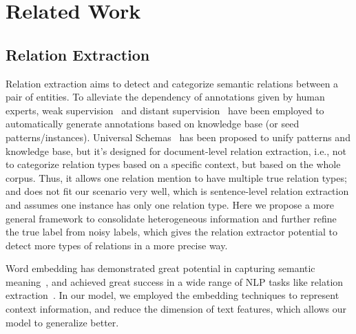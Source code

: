 \section{Related Work}
\label{sect:related}


\subsection{Relation Extraction}
Relation extraction aims to detect and categorize semantic relations between a pair of entities. To alleviate the dependency of annotations given by human experts, weak supervision~\cite{bunescu2007learning,etzioni2004web} and distant supervision~\cite{ren2016cotype} have been employed to automatically generate annotations based on knowledge base (or seed patterns/instances). 
Universal Schemas~\cite{riedel2013relation,verga2015multilingual,toutanova2015representing} has been proposed to unify patterns and knowledge base, but it's designed for document-level relation extraction, i.e., not to categorize relation types based on a specific context, but based on the whole corpus. 
Thus, it allows one relation mention to have multiple true relation types; and does not fit our scenario very well, which is sentence-level relation extraction and assumes one instance has only one relation type. 
Here we propose a more general framework to consolidate heterogeneous information and further refine the true label from noisy labels, which gives the relation extractor potential to detect more types of relations in a more precise way.

Word embedding has demonstrated great potential in capturing semantic meaning~\cite{mikolov2013distributed}, and achieved great success in a wide range of NLP tasks like relation extraction~\cite{zeng2014relation,takase2016composing,nguyen2015combining}.
In our model, we employed the embedding techniques to represent context information, and reduce the dimension of text features, which allows our model to generalize better.


